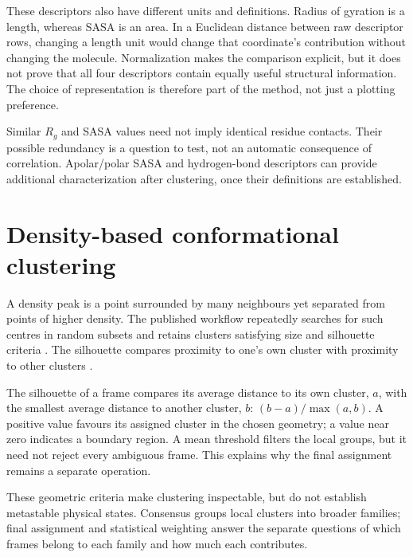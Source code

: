 These descriptors also have different units and definitions. Radius of gyration is a length, whereas SASA is an area. In a Euclidean distance between raw descriptor rows, changing a length unit would change that coordinate's contribution without changing the molecule. Normalization makes the comparison explicit, but it does not prove that all four descriptors contain equally useful structural information. The choice of representation is therefore part of the method, not just a plotting preference.

Similar $R_g$ and SASA values need not imply identical residue contacts. Their possible redundancy is a question to test, not an automatic consequence of correlation. Apolar/polar SASA and hydrogen-bond descriptors can provide additional characterization after clustering, once their definitions are established.

\section{Density-based conformational clustering}
A density peak is a point surrounded by many neighbours yet separated from points of higher density. The published workflow repeatedly searches for such centres in random subsets and retains clusters satisfying size and silhouette criteria \autocite{cadenelli2026}. The silhouette compares proximity to one's own cluster with proximity to other clusters \autocite{rousseeuw1987}.

The silhouette of a frame compares its average distance to its own cluster, $a$, with the smallest average distance to another cluster, $b$: $(b-a)/\max(a,b)$. A positive value favours its assigned cluster in the chosen geometry; a value near zero indicates a boundary region. A mean threshold filters the local groups, but it need not reject every ambiguous frame. This explains why the final assignment remains a separate operation.

These geometric criteria make clustering inspectable, but do not establish metastable physical states. Consensus groups local clusters into broader families; final assignment and statistical weighting answer the separate questions of which frames belong to each family and how much each contributes.
